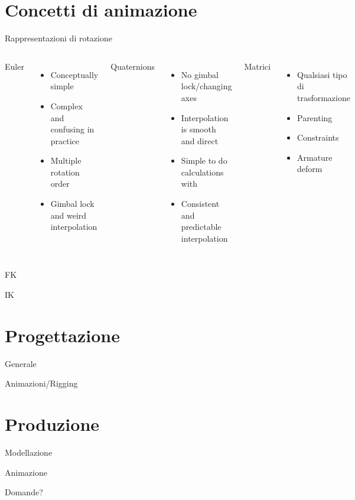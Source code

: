\documentclass[10pt]{beamer}
\begin{document}
\section{Concetti di animazione}
\begin{frame}{Rappresentazioni di rotazione}
  \begin{columns}[T,onlytextwidth]
    Euler
      \begin{itemize}[<+- | alert@+>]
        \item Conceptually simple
        \item Complex and confusing in practice
        \item Multiple rotation order
        \item Gimbal lock and weird interpolation
      \end{itemize}

      Quaternions
      \begin{itemize}[<+- | alert@+>]
        \item No gimbal lock/changing axes
        \item Interpolation is smooth and direct
        \item Simple to do calculations with
        \item Consistent and predictable interpolation
      \end{itemize}
      
    Matrici
      \begin{itemize}[<+- | alert@+>]
        \item \alert<5>{Qualsiasi tipo di trasformazione}
        \item Parenting
        \item Constraints
        \item Armature deform
      \end{itemize}
  \end{columns}
\end{frame}
\begin{frame}{FK}
\end{frame}
\begin{frame}{IK}
\end{frame}

\section{Progettazione}
\begin{frame}{Generale}
\end{frame}
\begin{frame}{Animazioni/Rigging}
\end{frame}

\section{Produzione}
\begin{frame}{Modellazione}
\end{frame}
\begin{frame}{Animazione}
\end{frame}

{
\begin{frame}[standout]

Domande?

\end{frame}
}
\end{document}
